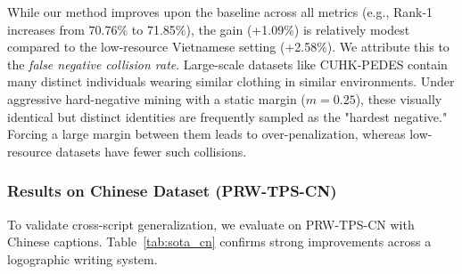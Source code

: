 \documentclass{article}
\begin{document}
\begin{table}[H]
    \centering
    \caption{Comparison on the CUHK-PEDES dataset. Best results appear in bold; second-best results are underlined.}
    \label{tab:sota_cuhk}
\end{table}

While our method improves upon the baseline across all metrics (e.g., Rank-1 increases from 70.76\% to 71.85\%), the gain (+1.09\%) is relatively modest compared to the low-resource Vietnamese setting (+2.58\%). We attribute this to the \textit{false negative collision rate}. Large-scale datasets like CUHK-PEDES contain many distinct individuals wearing similar clothing in similar environments. Under aggressive hard-negative mining with a static margin ($m=0.25$), these visually identical but distinct identities are frequently sampled as the "hardest negative." Forcing a large margin between them leads to over-penalization, whereas low-resource datasets have fewer such collisions.

\subsubsection{Results on Chinese Dataset (PRW-TPS-CN)}
To validate cross-script generalization, we evaluate on PRW-TPS-CN with Chinese captions. Table~\ref{tab:sota_cn} confirms strong improvements across a logographic writing system.
\end{document}
